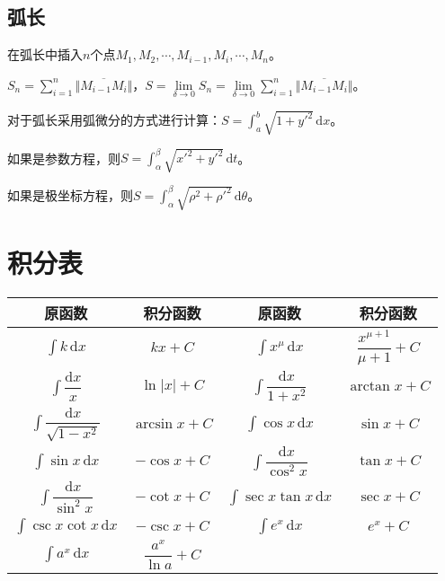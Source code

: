 \documentclass[UTF8, 12pt]{ctexart}
\begin{document}
\subsection{弧长}

在弧长中插入$n$个点$M_1,M_2,\cdots,M_{i-1},M_i,\cdots,M_n$。

$S_n=\sum\limits_{i=1}^n\Vert\overline{M_{i-1}M_{i}}\Vert$，$S=\lim\limits_{\delta\to 0}S_n=\lim\limits_{\delta\to 0}\sum\limits_{i=1}^n\Vert\overline{M_{i-1}M_{i}}\Vert$。

对于弧长采用弧微分的方式进行计算：$S=\int_a^b\sqrt{1+y'^2}\,\textrm{d}x$。

如果是参数方程，则$S=\int_\alpha^\beta\sqrt{x'^2+y'^2}\,\textrm{d}t$。

如果是极坐标方程，则$S=\int_\alpha^\beta\sqrt{\rho^2+\rho'^2}\,\textrm{d}\theta$。

\section{积分表}

\begin{center}
    \begin{tabular}{|c|c|c|c|}
        \hline
        原函数 & 积分函数 & 原函数 & 积分函数\\ \hline
        $\int k\,\textrm{d}x$ & $kx+C$ & $\int x^\mu\,\textrm{d}x$ & $\dfrac{x^{\mu+1}}{\mu+1}+C$ \\ \hline
        $\int\dfrac{\textrm{d}x}{x}$ & $\ln\vert x\vert+C$ & $\int\dfrac{\textrm{d}x}{1+x^2}$ & $\arctan x+C$ \\ \hline
        $\int\dfrac{\textrm{d}x}{\sqrt{1-x^2}}$ & $\arcsin x+C$ & $\int\cos x\,\textrm{d}x$ & $\sin x+C$ \\ \hline
        $\int\sin x\,\textrm{d}x$ & $-\cos x+C$ & $\int\dfrac{\textrm{d}x}{\cos^2x}$ & $\tan x+C$ \\ \hline
        $\int\dfrac{\textrm{d}x}{\sin^2x}$ & $-\cot x+C$ & $\int\sec x\tan x\,\textrm{d}x$ & $\sec x+C$ \\ \hline
        $\int\csc x\cot x\,\textrm{d}x$ & $-\csc x+C$ & $\int e^x\,\textrm{d}x$ & $e^x+C$ \\ \hline
        $\int a^x\,\textrm{d}x$ & $\dfrac{a^x}{\ln a}+C$ & & \\
        \hline
    \end{tabular}
\end{center}
\end{document}
